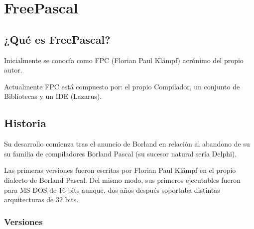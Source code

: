 \section{FreePascal}

%

\subsection{¿Qué es FreePascal?}

% 
% 
%  
% 
% 
% 

Inicialmente se conocía como FPC (Florian Paul Klämpf) acrónimo del propio autor.

Actualmente FPC está compuesto por: el propio Compilador, un conjunto de 
Bibliotecas y un IDE (Lazarus).

\subsection{Historia}

Su desarrollo comienza tras el anuncio de Borland en relación al abandono de su 
su familia de compiladores Borland Pascal (su sucesor natural sería Delphi).


Las primeras versiones fueron escritas por Florian Paul Klämpf en el propio 
dialecto de Borland Pascal. Del mismo modo, sus primeros ejecutables fueron para MS-DOS de 16 
bits aunque, dos años después soportaba distintas arquitecturas de 32 bits.

\subsubsection{Versiones}

